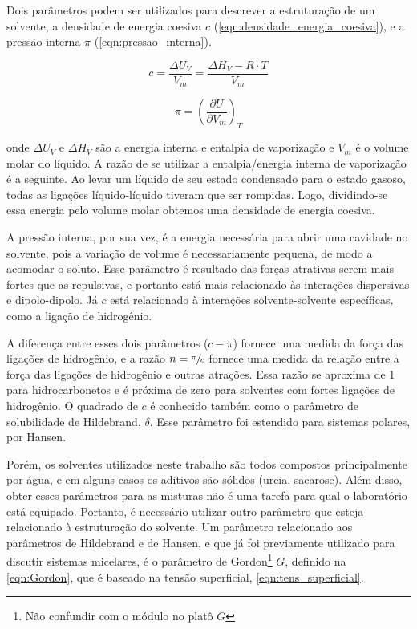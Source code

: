 		Dois parâmetros podem ser utilizados para descrever a estruturação de um solvente, a densidade de energia coesiva \(c\) (\autoref{eqn:densidade_energia_coesiva}), e a pressão interna \(\pi\) (\autoref{eqn:pressao_interna}). \cite{ReichardtSolvents}
		
		\begin{equation}
			c = \dfrac{\Delta U_V}{V_m} = \dfrac{\Delta H_V - R\cdot T}{V_m}
			\label{eqn:densidade_energia_coesiva}
		\end{equation}
		
		\begin{equation}
			\pi = \left( \dfrac{\partial U}{\partial V_m} \right)_T
			\label{eqn:pressao_interna}
		\end{equation}
		
		\noindent onde \(\Delta U_V\) e \(\Delta H_V\) são a energia interna e entalpia de vaporização e \(V_m\) é o volume molar do líquido. A razão de se utilizar a entalpia/energia interna de vaporização é a seguinte. Ao levar um líquido de seu estado condensado para o estado gasoso, todas as ligações líquido-líquido tiveram que ser rompidas. Logo, dividindo-se essa energia pelo volume molar obtemos uma densidade de energia coesiva.\cite{ReichardtSolvents} 
		
		
		A pressão interna, por sua vez, é a energia necessária para abrir uma cavidade no solvente, pois a variação de volume é necessariamente pequena, de modo a acomodar o soluto. Esse parâmetro é resultado das forças atrativas serem mais fortes que as repulsivas, e portanto está mais relacionado às interações dispersivas e dipolo-dipolo. Já \(c\) está relacionado à interações solvente-solvente específicas, como a ligação de hidrogênio.\cite{ReichardtSolvents}
		
		A diferença entre esses dois parâmetros (\(c - \pi\)) fornece uma medida da força das ligações de hidrogênio, e a razão \(n = \sfrac{\pi}{c}\) fornece uma medida da relação entre a força das ligações de hidrogênio e outras atrações. Essa razão se aproxima de 1 para hidrocarbonetos e é próxima de zero para solventes com fortes ligações de hidrogênio. O quadrado de \(c\) é conhecido também como o parâmetro de solubilidade de Hildebrand, \(\delta\). Esse parâmetro foi estendido para sistemas polares, por Hansen.\cite{ReichardtSolvents}
		
		Porém, os solventes utilizados neste trabalho são todos compostos principalmente por água, e em alguns casos os aditivos são sólidos (ureia, sacarose). Além disso, obter esses parâmetros para as misturas não é uma tarefa para qual o laboratório está equipado. Portanto, é necessário utilizar outro parâmetro que esteja relacionado à estruturação do solvente. Um parâmetro relacionado aos parâmetros de Hildebrand e de Hansen, e que já foi previamente utilizado para discutir sistemas micelares,\cite{Moya2007a, Abdel-Rahem2012} é o parâmetro de Gordon\footnote{Não confundir com o módulo no platô \(G\)} \(G\), definido na \autoref{eqn:Gordon}, que é baseado na tensão superficial, \autoref{eqn:tens_superficial}.\cite{ReichardtSolvents}

